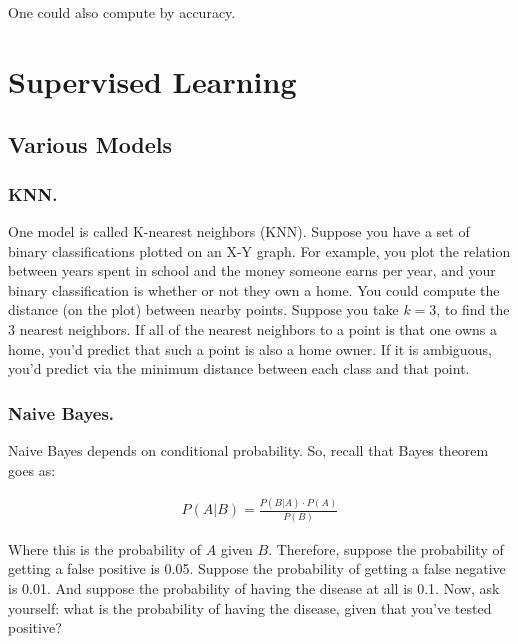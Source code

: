 One could also compute by accuracy. 

\section{Supervised Learning}

\subsection{Various Models}

\subsubsection{KNN.}
One model is called K-nearest neighbors (KNN). Suppose you have a set of binary classifications plotted on an X-Y graph. For example, you plot the relation between years spent in school and the money someone earns per year, and your binary classification is whether or not they own a home. You could compute the distance (on the plot) between nearby points. Suppose you take $k = 3$, to find the 3 nearest neighbors. If all of the nearest neighbors to a point is that one owns a home, you'd predict that such a point is also a home owner. If it is ambiguous, you'd predict via the minimum distance between each class and that point. 

\subsubsection{Naive Bayes.}

\label{sec:naivebayes}

Naive Bayes depends on conditional probability. So, recall that Bayes theorem goes as: 

\begin{equation}
\begin{split}
    P(A | B) = \frac{P(B | A) \cdot P(A)}{P(B)}
\end{split}
\end{equation}

Where this is the probability of $A$ given $B$. Therefore, suppose the probability of getting a false positive is 0.05. Suppose the probability of getting a false negative is 0.01. And suppose the probability of having the disease at all is 0.1. Now, ask yourself: what is the probability of having the disease, given that you've tested positive?\newline


